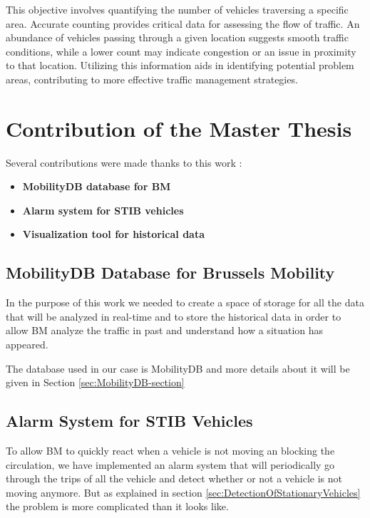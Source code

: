 \documentclass[12pt]{report}
\begin{document}
	This objective involves quantifying the number of vehicles traversing a specific area. Accurate counting provides critical data for assessing the flow of traffic. An abundance of vehicles passing through a given location suggests smooth traffic conditions, while a lower count may indicate congestion or an issue in proximity to that location. Utilizing this information aids in identifying potential problem areas, contributing to more effective traffic management strategies.
	
	
	
	\section{Contribution of the Master Thesis}	
	
	Several contributions were made thanks to this work :
	\begin{itemize}[noitemsep]
		\item \textbf{MobilityDB database for BM}
		\item \textbf{Alarm system for STIB vehicles}
		\item \textbf{Visualization tool for historical data}
	\end{itemize}
	
	\subsection{MobilityDB Database for Brussels Mobility}
	
	In the purpose of this work we needed to create a space of storage for all the data that will be analyzed in real-time and to store the historical data in order to allow BM analyze the traffic in past and understand how a situation has appeared.
	
	The database used in our case is MobilityDB and more details about it will be given in Section \ref{sec:MobilityDB-section}
	
	\subsection{Alarm System for STIB Vehicles}
	
	To allow BM to quickly react when a vehicle is not moving an blocking the circulation, we have implemented an alarm system that will periodically go through the trips of all the vehicle and detect whether or not a vehicle is not moving anymore. But as explained in section \ref{sec:DetectionOfStationaryVehicles} the problem is more complicated than it looks like.
	
\end{document}
